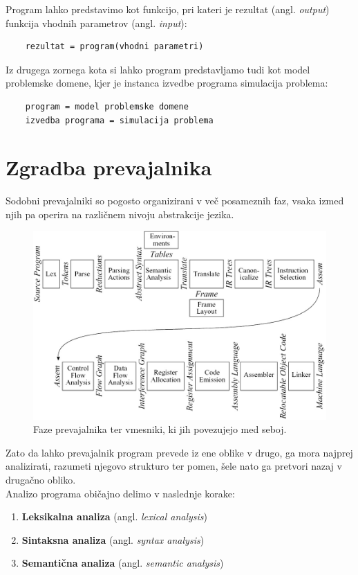 \documentclass[a4paper, 12pt]{book}
\begin{document}
Program lahko predstavimo kot funkcijo, pri kateri je rezultat (angl. \textit{output}) funkcija vhodnih parametrov (angl. \textit{input}):
\begin{lstlisting}
	rezultat = program(vhodni parametri)
\end{lstlisting}

Iz drugega zornega kota si lahko program predstavljamo tudi kot model problemske domene, kjer je instanca izvedbe programa simulacija problema:
\begin{lstlisting}
	program = model problemske domene
	izvedba programa = simulacija problema
\end{lstlisting}
\cite{computationalModel}

\section{Zgradba prevajalnika}

Sodobni prevajalniki so pogosto organizirani v več posameznih faz, vsaka izmed njih pa operira na različnem nivoju abstrakcije jezika. \cite{modernCompiler}

\begin{figure}[h]
	\begin{center}
		\includegraphics[width=1\textwidth]{resources/compilerPhases.jpg}
	\end{center}
	\caption{Faze prevajalnika ter vmesniki, ki jih povezujejo med seboj.}
	\label{pic1}
\end{figure}

Zato da lahko prevajalnik program prevede iz ene oblike v drugo, ga mora najprej analizirati, razumeti njegovo strukturo ter pomen, šele nato ga pretvori nazaj v drugačno obliko.  \\
Analizo programa običajno delimo v naslednje korake:
\begin{enumerate}
	\item \textbf{Leksikalna analiza} (angl. \textit{lexical analysis})
	\item \textbf{Sintaksna analiza} (angl. \textit{syntax analysis})
	\item \textbf{Semantična analiza} (angl. \textit{semantic analysis})
\end{enumerate}
\cite{modernCompiler}
\end{document}
